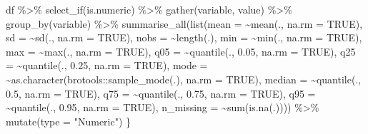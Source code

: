 \documentclass[
]{article}
\newenvironment{Shaded}{\begin{snugshade}}{\end{snugshade}}
\newcommand{\AttributeTok}[1]{\textcolor[rgb]{0.77,0.63,0.00}{#1}}
\newcommand{\ConstantTok}[1]{\textcolor[rgb]{0.00,0.00,0.00}{#1}}
\newcommand{\FloatTok}[1]{\textcolor[rgb]{0.00,0.00,0.81}{#1}}
\newcommand{\FunctionTok}[1]{\textcolor[rgb]{0.00,0.00,0.00}{#1}}
\newcommand{\NormalTok}[1]{#1}
\newcommand{\SpecialCharTok}[1]{\textcolor[rgb]{0.00,0.00,0.00}{#1}}
\newcommand{\StringTok}[1]{\textcolor[rgb]{0.31,0.60,0.02}{#1}}
\begin{document}
\begin{Shaded}
\begin{Highlighting}[]
\NormalTok{    df }\SpecialCharTok{\%\textgreater{}\%}
        \FunctionTok{select\_if}\NormalTok{(is.numeric) }\SpecialCharTok{\%\textgreater{}\%}
        \FunctionTok{gather}\NormalTok{(variable, value) }\SpecialCharTok{\%\textgreater{}\%}
        \FunctionTok{group\_by}\NormalTok{(variable) }\SpecialCharTok{\%\textgreater{}\%}
        \FunctionTok{summarise\_all}\NormalTok{(}\FunctionTok{list}\NormalTok{(}\AttributeTok{mean =} \SpecialCharTok{\textasciitilde{}}\FunctionTok{mean}\NormalTok{(., }\AttributeTok{na.rm =} \ConstantTok{TRUE}\NormalTok{),}
                           \AttributeTok{sd =} \SpecialCharTok{\textasciitilde{}}\FunctionTok{sd}\NormalTok{(., }\AttributeTok{na.rm =} \ConstantTok{TRUE}\NormalTok{),}
                           \AttributeTok{nobs =} \SpecialCharTok{\textasciitilde{}}\FunctionTok{length}\NormalTok{(.),}
                           \AttributeTok{min =} \SpecialCharTok{\textasciitilde{}}\FunctionTok{min}\NormalTok{(., }\AttributeTok{na.rm =} \ConstantTok{TRUE}\NormalTok{),}
                           \AttributeTok{max =} \SpecialCharTok{\textasciitilde{}}\FunctionTok{max}\NormalTok{(., }\AttributeTok{na.rm =} \ConstantTok{TRUE}\NormalTok{),}
                           \AttributeTok{q05 =} \SpecialCharTok{\textasciitilde{}}\FunctionTok{quantile}\NormalTok{(., }\FloatTok{0.05}\NormalTok{, }\AttributeTok{na.rm =} \ConstantTok{TRUE}\NormalTok{),}
                           \AttributeTok{q25 =} \SpecialCharTok{\textasciitilde{}}\FunctionTok{quantile}\NormalTok{(., }\FloatTok{0.25}\NormalTok{, }\AttributeTok{na.rm =} \ConstantTok{TRUE}\NormalTok{),}
                           \AttributeTok{mode =} \SpecialCharTok{\textasciitilde{}}\FunctionTok{as.character}\NormalTok{(brotools}\SpecialCharTok{::}\FunctionTok{sample\_mode}\NormalTok{(.), }\AttributeTok{na.rm =} \ConstantTok{TRUE}\NormalTok{),}
                           \AttributeTok{median =} \SpecialCharTok{\textasciitilde{}}\FunctionTok{quantile}\NormalTok{(., }\FloatTok{0.5}\NormalTok{, }\AttributeTok{na.rm =} \ConstantTok{TRUE}\NormalTok{),}
                           \AttributeTok{q75 =} \SpecialCharTok{\textasciitilde{}}\FunctionTok{quantile}\NormalTok{(., }\FloatTok{0.75}\NormalTok{, }\AttributeTok{na.rm =} \ConstantTok{TRUE}\NormalTok{),}
                           \AttributeTok{q95 =} \SpecialCharTok{\textasciitilde{}}\FunctionTok{quantile}\NormalTok{(., }\FloatTok{0.95}\NormalTok{, }\AttributeTok{na.rm =} \ConstantTok{TRUE}\NormalTok{),}
                           \AttributeTok{n\_missing =} \SpecialCharTok{\textasciitilde{}}\FunctionTok{sum}\NormalTok{(}\FunctionTok{is.na}\NormalTok{(.)))) }\SpecialCharTok{\%\textgreater{}\%}
        \FunctionTok{mutate}\NormalTok{(}\AttributeTok{type =} \StringTok{"Numeric"}\NormalTok{)}
\NormalTok{\}}
\end{Highlighting}
\end{Shaded}
\end{document}
